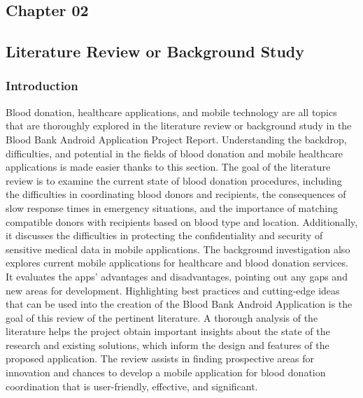 \begin{center}
   \chapter{Chapter 02}
\end{center}
\vspace{11mm}
\section{Literature Review or Background Study}
\subsection{Introduction}
Blood donation, healthcare applications, and mobile technology are all topics that are thoroughly
explored in the literature review or background study in the Blood Bank Android Application
Project Report. Understanding the backdrop, difficulties, and potential in the fields of blood
donation and mobile healthcare applications is made easier thanks to this section. The goal of 
the literature review is to examine the current state of blood donation procedures, including the
difficulties in coordinating blood donors and recipients, the consequences of slow response times
in emergency situations, and the importance of matching compatible donors with recipients
based on blood type and location. Additionally, it discusses the difficulties in protecting the
confidentiality and security of sensitive medical data in mobile applications. The background
investigation also explores current mobile applications for healthcare and blood donation
services. It evaluates the apps' advantages and disadvantages, pointing out any gaps and new
areas for development. Highlighting best practices and cutting-edge ideas that can be used into
the creation of the Blood Bank Android Application is the goal of this review of the pertinent
literature. A thorough analysis of the literature helps the project obtain important insights about
the state of the research and existing solutions, which inform the design and features of the
proposed application. The review assists in finding prospective areas for innovation and chances
to develop a mobile application for blood donation coordination that is user-friendly, effective,
and significant.
